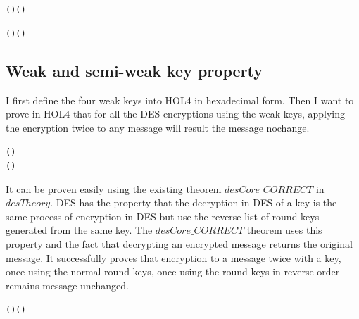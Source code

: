 \documentclass{article}
\begin{document}
\begin{alltt}
   \HOLTokenTurnstile{}   ( ) \HOLSymConst{=}  (  )
\end{alltt}

\begin{alltt}
   \HOLTokenTurnstile{}   (  ) \HOLSymConst{=}  ( \HOLSymConst{\HOLTokenCompose} ) 
\end{alltt}

\subsection{Weak and semi-weak key property}
I first define the four weak keys into HOL4 in hexadecimal form. Then I want to prove in HOL4 that for all the DES encryptions using
the weak keys, applying the encryption twice to any message will result the message nochange.

\begin{alltt}
   \HOLTokenTurnstile{}    \HOLSymConst{\HOLTokenConj{}}   \HOLSymConst{=} (\HOLSymConst{,}) \HOLSymConst{\HOLTokenImp{}}
    ( ) \HOLSymConst{=} 
\end{alltt}

It can be proven easily using the existing theorem $desCore\_CORRECT$ in $desTheory$. DES has the property that
the decryption in DES of a key is the same process of encryption in DES but use the reverse list of round keys generated
from the same key. The $desCore\_CORRECT$ theorem uses this property and the fact that decrypting an encrypted message
returns the original message. It successfully proves that encryption to a message twice with a key,
once using the normal round keys, once using the round keys in reverse order remains message unchanged.

\begin{alltt}
   \HOLTokenTurnstile{}   \HOLSymConst{=}  \HOLSymConst{\HOLTokenImp{}}
     ( ) (   ) \HOLSymConst{=}
\end{alltt}
\end{document}
